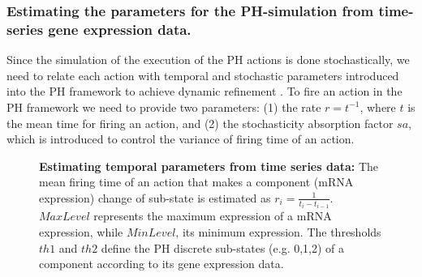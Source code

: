 
\subsubsection{Estimating the parameters for the PH-simulation from time-series gene expression data.}
\label{sssec:EPTSD}

Since the simulation of the execution of the PH actions is done stochastically, we need to relate each action with temporal 
and stochastic parameters introduced into the PH framework to achieve dynamic refinement \cite{PMR10-TCSB}. 
To fire an action in the PH framework we need to provide two parameters: (1) the rate $r=t^{-1}$, where $t$ is the mean time for firing an action,
and (2) the stochasticity absorption factor $sa$, which is introduced to control the variance of firing time of an action.


\begin{figure}[H]
\centering

	    

\caption{{\bf Estimating temporal parameters from time series data:} The mean firing time of an action that makes a
component (mRNA expression) change of sub-state is estimated as $r_{i}=\frac{1}{t_{i}-t_{i-1}}$. $MaxLevel$ represents the maximum expression of a mRNA expression, while 
 $MinLevel$, its minimum expression.
The thresholds $th1$ and $th2$ define the PH discrete sub-states (e.g. 0,1,2) of a component according to its gene expression data.
\label{fig:estimationParameter}}
\end{figure}



